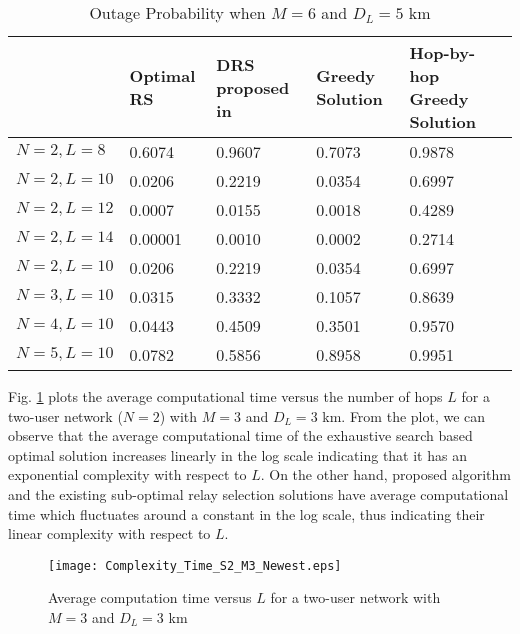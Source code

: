\documentclass[12pt,draftclsnofoot,onecolumn]{IEEEtran}
\begin{document}
	\begin{table}%
		\centering
		\caption{Outage Probability when $M=6$ and $D_L=5$ km}
		\begin{tabular}
			{ |p{3cm}|p{2.75cm}|p{2.75cm}|p{2.75cm}|p{2.75cm}| }
			\hline
			& Optimal RS & DRS proposed in \cite{2809748} & Greedy Solution & Hop-by-hop Greedy Solution \\ \hline  
			$N=2, L=8$ & 0.6074 & 0.9607 & 0.7073 & 0.9878 \\ \hline
			$N=2, L=10$ & 0.0206 & 0.2219 & 0.0354 & 0.6997 \\ \hline
			$N=2, L=12$ & 0.0007 & 0.0155 & 0.0018 & 0.4289 \\ \hline
			$N=2, L=14$ & 0.00001 & 0.0010 & 0.0002 & 0.2714 \\ \hline
			$N=2, L=10$ & 0.0206  & 0.2219 & 0.0354 & 0.6997 \\ \hline
			$N=3, L=10$ & 0.0315 & 0.3332 & 0.1057 & 0.8639 \\ \hline
			$N=4, L=10$ & 0.0443 & 0.4509 & 0.3501 & 0.9570 \\ \hline
			$N=5, L=10$ & 0.0782 & 0.5856 & 0.8958 & 0.9951 \\ \hline
		\end{tabular}
		\label{table2}
	\end{table}

	Fig. \ref{figure7} plots the average computational time versus the number of hops $L$ for a two-user network ($N=2$) with $M=3$ and $D_L=3$ km. From the plot, we can observe that the average computational time of the exhaustive search based optimal solution increases linearly in the log scale indicating that it has an exponential complexity with respect to $L$. On the other hand, proposed algorithm and the existing sub-optimal relay selection solutions have average computational time which fluctuates around a constant in the log scale, thus indicating their linear complexity with respect to $L$.
	\begin{figure}
		\centering\texttt{[image: Complexity\_Time\_S2\_M3\_Newest.eps]}
		\centering\caption{Average computation time versus $L$ for a two-user network with $M=3$ and $D_L=3$ km}
		\label{figure7}
	\end{figure}
	
\end{document}
